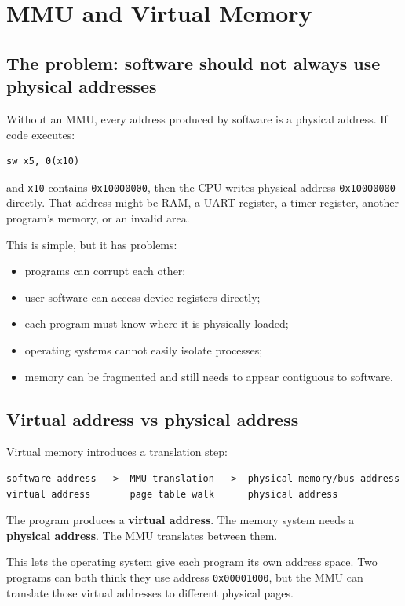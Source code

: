 \section{MMU and Virtual Memory}

\subsection{The problem: software should not always use physical addresses}

Without an MMU, every address produced by software is a physical address. If code executes:

\begin{lstlisting}[language={}]
sw x5, 0(x10)
\end{lstlisting}

and \texttt{x10} contains \texttt{0x10000000}, then the CPU writes physical address \texttt{0x10000000} directly. That address might be RAM, a UART register, a timer register, another program’s memory, or an invalid area.

This is simple, but it has problems:

\begin{itemize}
\item programs can corrupt each other;
\item user software can access device registers directly;
\item each program must know where it is physically loaded;
\item operating systems cannot easily isolate processes;
\item memory can be fragmented and still needs to appear contiguous to software.
\end{itemize}
\subsection{Virtual address vs physical address}

Virtual memory introduces a translation step:

\begin{lstlisting}[language={}]
software address  ->  MMU translation  ->  physical memory/bus address
virtual address       page table walk      physical address
\end{lstlisting}

The program produces a \textbf{virtual address}. The memory system needs a \textbf{physical address}. The MMU translates between them.

This lets the operating system give each program its own address space. Two programs can both think they use address \texttt{0x00001000}, but the MMU can translate those virtual addresses to different physical pages.

